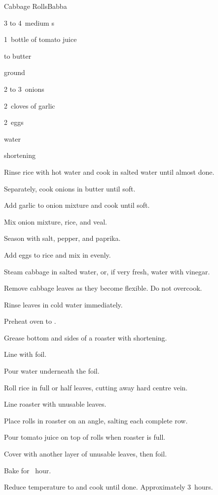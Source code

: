 \begin{recipe}{Cabbage Rolls}{Babba}{}

\begin{ingredients}
\item 3 to 4~medium s
\item 1~bottle of tomato juice
\item {} 
\item \lbs{\quarter} to \lbs{\half} butter
\item {} ground 
\item 2 to 3~onions
\item 2~cloves of garlic
\item 2~eggs
\item {} water
\item shortening
\end{ingredients}

\begin{directions}
\item Rinse rice with hot water and cook in salted water until almost done.
\item Separately, cook onions in butter until soft.
\item Add garlic to onion mixture and cook until soft.
\item Mix onion mixture, rice, and veal.
\item Season with salt, pepper, and paprika.
\item Add eggs to rice and mix in evenly.
\item Steam cabbage in salted water, or, if very fresh, water with vinegar.
\item Remove cabbage leaves as they become flexible. Do not overcook.
\item Rinse leaves in cold water immediately.
\item Preheat oven to .
\item Grease bottom and sides of a roaster with shortening.
\item Line with foil.
\item Pour water underneath the foil.
\item Roll rice in full or half leaves, cutting away hard centre vein.
\item Line roaster with unusable leaves.
\item Place rolls in roaster on an angle, salting each complete row.
\item Pour tomato juice on top of rolls when roaster is full.
\item Cover with another layer of unusable leaves, then foil.
\item Bake for \half~hour.
\item Reduce temperature to  and cook until done. Approximately 3~hours.
\end{directions}

\end{recipe}
